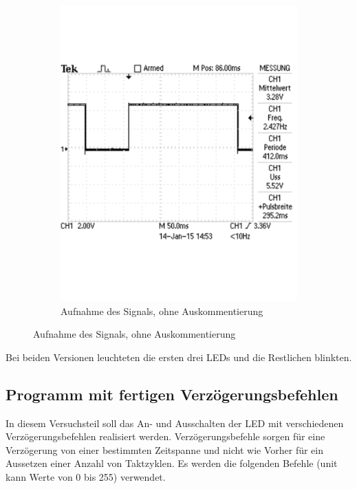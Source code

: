 \documentclass[12pt,a4paper]{article}
\begin{document}
\begin{figure}[H]
\begin{subfigure}[b]{0.45\textwidth}
   \includegraphics[trim = 0mm 50mm 0mm 50mm, clip, scale = 0.4]{TEK0004.pdf}
  \caption[Aufnahme des Signals, ohne Auskommentierung]{Aufnahme des Signals, ohne Auskommentierung} 
  \label{fig:g_4}
\end{subfigure}
\end{figure}

Bei beiden Versionen leuchteten die ersten drei LEDs und die Restlichen blinkten.

\subsection{Programm mit fertigen Verzögerungsbefehlen}

In diesem Versuchsteil soll das An- und Ausschalten der LED mit verschiedenen Verzögerungsbefehlen realisiert werden. Verzögerungsbefehle sorgen für eine Verzögerung von einer bestimmten Zeitspanne und nicht wie Vorher für ein Aussetzen einer Anzahl von Taktzyklen. Es werden die folgenden Befehle (unit kann Werte von 0 bis 255) verwendet.
\end{document}
